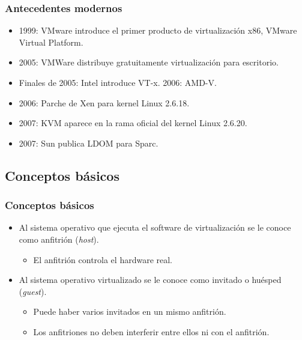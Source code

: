 \documentclass{beamer}
\begin{document}
\begin{frame}
\frametitle{Antecedentes modernos}

\begin{itemize}
\item \alert{1999}: VMware introduce el primer producto de virtualización x86, VMware Virtual Platform.
\item \alert{2005}: VMWare distribuye gratuitamente virtualización para escritorio.
\item \alert{Finales de 2005}: Intel introduce VT-x. \alert{2006}: AMD-V.
\item \alert{2006}: Parche de Xen para kernel Linux 2.6.18.
\item \alert{2007}: KVM aparece en la rama oficial del kernel Linux 2.6.20.
\item \alert{2007}: Sun publica LDOM para Sparc. 
\end{itemize}

\end{frame}


\subsection{Conceptos básicos}



\begin{frame}
\frametitle{Conceptos básicos}

\begin{itemize}
\item Al sistema operativo que ejecuta el software de virtualización se le conoce como \alert{anfitrión} (\textit{host}).
	\begin{itemize}
	\item El anfitrión controla el hardware real.
	\end{itemize}
\item Al sistema operativo virtualizado se le conoce como \alert{invitado} o \alert{huésped} (\textit{guest}).
	\begin{itemize}
	\item Puede haber varios invitados en un mismo anfitrión. 
	\item Los anfitriones no deben interferir entre ellos ni con el anfitrión.
	\end{itemize}
\end{itemize}

\end{frame}
\end{document}
